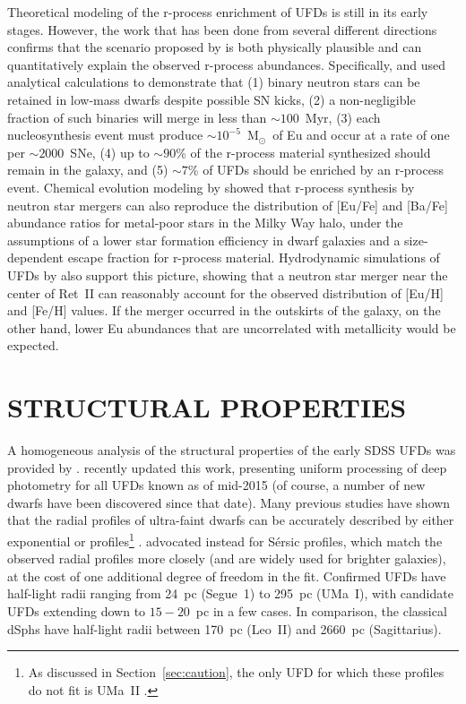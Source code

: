 \documentclass[a4paper]{ar-1col}
\newcommand{\msun}        {M$_{\odot}$}
\begin{document}
Theoretical modeling of the r-process enrichment of UFDs is still in
its early stages.  However, the work that has been done from several
different directions confirms that the scenario proposed by
\citet{ji16} is both physically plausible and can quantitatively
explain the observed r-process abundances.  Specifically,
\citet{beniamini16a,beniamini16b} and \citet{beniamini18} used
analytical calculations to demonstrate that (1) binary neutron stars
can be retained in low-mass dwarfs despite possible SN kicks, (2) a
non-negligible fraction of such binaries will merge in less than
$\sim100$~Myr, (3) each nucleosynthesis event must produce
$\sim10^{-5}$~\msun\ of Eu and occur at a rate of one per
$\sim2000$~SNe, (4) up to $\sim90$\% of the r-process material
synthesized should remain in the galaxy, and (5) $\sim7$\% of UFDs
should be enriched by an r-process event.  Chemical evolution modeling
by \citet{ks16} showed that r-process synthesis by neutron star
mergers can also reproduce the distribution of [Eu/Fe] and [Ba/Fe]
abundance ratios for metal-poor stars in the Milky Way halo, under the
assumptions of a lower star formation efficiency in dwarf galaxies and
a size-dependent escape fraction for r-process material.  Hydrodynamic
simulations of UFDs by \citet{safarzadeh17} also support this picture,
showing that a neutron star merger near the center of Ret~II can
reasonably account for the observed distribution of [Eu/H] and [Fe/H]
values.  If the merger occurred in the outskirts of the galaxy, on the
other hand, lower Eu abundances that are uncorrelated with metallicity
would be expected.

\begin{landscape}

\clearpage
\end{landscape}


\section{STRUCTURAL PROPERTIES}
\label{sec:struc}

A homogeneous analysis of the structural properties of the early SDSS
UFDs was provided by \citet{martin08}.  \citet{munoz18b} recently
updated this work, presenting uniform processing of deep photometry
for all UFDs known as of mid-2015 (of course, a number of new dwarfs
have been discovered since that date).  Many previous studies have
shown that the radial profiles of ultra-faint dwarfs can be accurately
described by either exponential or \citet{plummer11}
profiles\footnote{As discussed in Section~\ref{sec:caution}, the only
  UFD for which these profiles do not fit is UMa~II
  \citep{munoz10,munoz18b}.}
\citep[e.g.,][]{belokurov06,martin08,sand10}.  \citet{munoz18b}
advocated instead for S{\'e}rsic profiles, which match the observed
radial profiles more closely (and are widely used for brighter
galaxies), at the cost of one additional degree of freedom in the fit.
Confirmed UFDs have half-light radii ranging from 24~pc (Segue~1) to
295~pc (UMa~I), with candidate UFDs extending down to $15-20$~pc in a
few cases.  In comparison, the classical dSphs have half-light radii
between 170~pc (Leo~II) and 2660~pc (Sagittarius).
\end{document}
